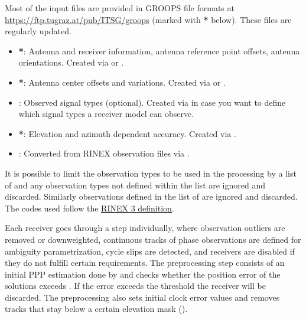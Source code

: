 Most of the input files are provided in GROOPS file formats at
\url{https://ftp.tugraz.at/pub/ITSG/groops} (marked with \textbf{*} below).
These files are regularly updated.
\begin{itemize}
  \item {}\textbf{*}:
        Antenna and receiver information, antenna reference point offsets, antenna orientations.
        Created via  or .
  \item {}\textbf{*}:
        Antenna center offsets and variations.
        Created via  or .
  \item {}:
        Observed signal types (optional).
        Created via  in case you want to define which signal
        types a receiver model can observe.
  \item {}\textbf{*}:
        Elevation and azimuth dependent accuracy.
        Created via .
  \item {}:
        Converted from RINEX observation files via .
\end{itemize}

It is possible to limit the observation types to be used in the processing by a list of 
and any observation types not defined within the list are ignored and discarded.
Similarly observations defined in the list of  are ignored and discarded.
The codes used follow the \href{https://files.igs.org/pub/data/format/rinex305.pdf}{RINEX 3 definition}.

Each receiver goes through a  step individually, where observation outliers are removed or downweighted,
continuous tracks of phase observations are defined for ambiguity parametrization, cycle slips are detected, and receivers are
disabled if they do not fulfill certain requirements. The preprocessing step consists of an initial PPP estimation done by
 and checks whether the position error
of the solutions exceeds . If the error exceeds the threshold the receiver will be discarded.
The preprocessing also sets initial clock error values and removes tracks that stay below a certain elevation mask ().

